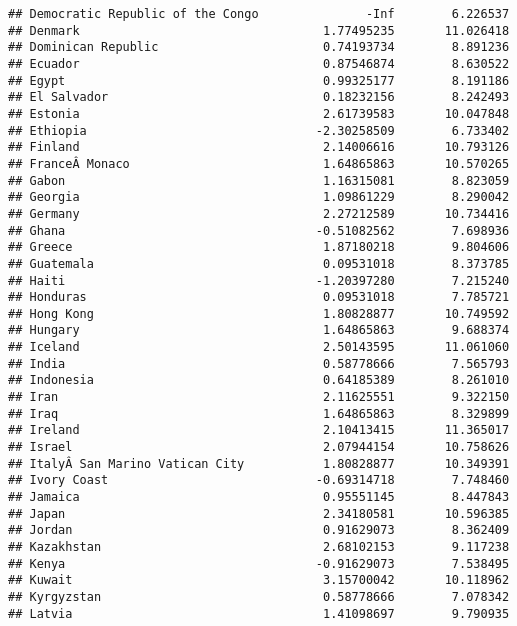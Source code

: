 \documentclass[
]{article}
\begin{document}
\begin{verbatim}
## Democratic Republic of the Congo               -Inf        6.226537
## Denmark                                  1.77495235       11.026418
## Dominican Republic                       0.74193734        8.891236
## Ecuador                                  0.87546874        8.630522
## Egypt                                    0.99325177        8.191186
## El Salvador                              0.18232156        8.242493
## Estonia                                  2.61739583       10.047848
## Ethiopia                                -2.30258509        6.733402
## Finland                                  2.14006616       10.793126
## FranceÂ Monaco                           1.64865863       10.570265
## Gabon                                    1.16315081        8.823059
## Georgia                                  1.09861229        8.290042
## Germany                                  2.27212589       10.734416
## Ghana                                   -0.51082562        7.698936
## Greece                                   1.87180218        9.804606
## Guatemala                                0.09531018        8.373785
## Haiti                                   -1.20397280        7.215240
## Honduras                                 0.09531018        7.785721
## Hong Kong                                1.80828877       10.749592
## Hungary                                  1.64865863        9.688374
## Iceland                                  2.50143595       11.061060
## India                                    0.58778666        7.565793
## Indonesia                                0.64185389        8.261010
## Iran                                     2.11625551        9.322150
## Iraq                                     1.64865863        8.329899
## Ireland                                  2.10413415       11.365017
## Israel                                   2.07944154       10.758626
## ItalyÂ San Marino Vatican City           1.80828877       10.349391
## Ivory Coast                             -0.69314718        7.748460
## Jamaica                                  0.95551145        8.447843
## Japan                                    2.34180581       10.596385
## Jordan                                   0.91629073        8.362409
## Kazakhstan                               2.68102153        9.117238
## Kenya                                   -0.91629073        7.538495
## Kuwait                                   3.15700042       10.118962
## Kyrgyzstan                               0.58778666        7.078342
## Latvia                                   1.41098697        9.790935

\end{verbatim}
\end{document}
